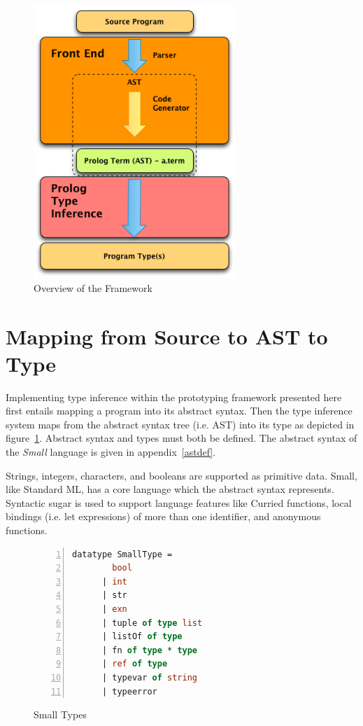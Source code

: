 \documentclass[10pt]{luthercs}
\begin{document}
\begin{figure}[htbp]
\centering
\includegraphics[width=3in]{hybrid.png}
\caption{Overview of the Framework}
\label{hybrid}
\end{figure}

\section{Mapping from Source to AST to Type}

Implementing type inference within the prototyping framework presented here first entails mapping a program into its abstract syntax. Then the type inference system maps from the abstract syntax tree (i.e. AST) into its type as depicted in figure~\ref{hybrid}. Abstract syntax and types must both be defined.  The abstract syntax of the {\em Small}  language is given in appendix~\ref{astdef}. 

Strings, integers, characters, and booleans are supported as primitive data. Small, like Standard ML, has a core language which the abstract syntax represents. Syntactic sugar is used to support language features like Curried functions, local bindings (i.e. let expressions) of more than one identifier, and anonymous functions. 

\begin{figure}[htbp]
\begin{lstlisting}[language=ML,numbers=left,numberstyle=\tiny]
datatype SmallType = 
        bool
      | int
      | str
      | exn
      | tuple of type list
      | listOf of type
      | fn of type * type
      | ref of type
      | typevar of string
      | typeerror
\end{lstlisting}
\caption{Small Types}
\label{smalltypes}
\end{figure}
\end{document}
